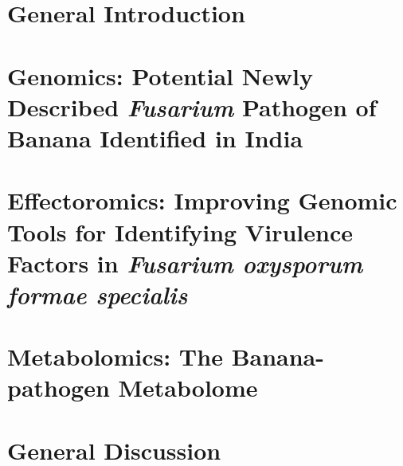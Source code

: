 \documentclass[11pt, a4paper, titles]{report}  %
\begin{document}
\clearpage

\setcounter{secnumdepth}{2}

      
\renewcommand{\arraystretch}{1.5} %

    
\chapter{General Introduction}\label{Chap1}
    
    
\chapter{Genomics: Potential Newly Described \textit{Fusarium} Pathogen of Banana Identified in India}\label{Chap2}
    
\chapter{Effectoromics: Improving Genomic Tools for Identifying Virulence Factors in  \textit{Fusarium oxysporum formae specialis}}\label{Chap3}
    
\chapter{Metabolomics: The Banana-pathogen Metabolome}\label{Chap4}
     

\chapter{General Discussion}\label{Chap5}

\end{document}
